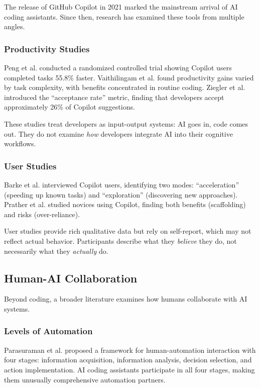 \documentclass{ntlabs-preprint}
\begin{document}
The release of GitHub Copilot in 2021 marked the mainstream arrival of AI coding assistants. Since then, research has examined these tools from multiple angles.

\subsubsection{Productivity Studies}

Peng et al. \citep{peng2023impact} conducted a randomized controlled trial showing Copilot users completed tasks 55.8\% faster. Vaithilingam et al. \citep{vaithilingam2022expectation} found productivity gains varied by task complexity, with benefits concentrated in routine coding. Ziegler et al. \citep{ziegler2022productivity} introduced the ``acceptance rate'' metric, finding that developers accept approximately 26\% of Copilot suggestions.

These studies treat developers as input-output systems: AI goes in, code comes out. They do not examine \textit{how} developers integrate AI into their cognitive workflows.

\subsubsection{User Studies}

Barke et al. \citep{barke2023grounded} interviewed Copilot users, identifying two modes: ``acceleration'' (speeding up known tasks) and ``exploration'' (discovering new approaches). Prather et al. \citep{prather2023s} studied novices using Copilot, finding both benefits (scaffolding) and risks (over-reliance).

User studies provide rich qualitative data but rely on self-report, which may not reflect actual behavior. Participants describe what they \textit{believe} they do, not necessarily what they \textit{actually} do.

\subsection{Human-AI Collaboration}

Beyond coding, a broader literature examines how humans collaborate with AI systems.

\subsubsection{Levels of Automation}

Parasuraman et al. \citep{parasuraman2000model} proposed a framework for human-automation interaction with four stages: information acquisition, information analysis, decision selection, and action implementation. AI coding assistants participate in all four stages, making them unusually comprehensive automation partners.
\end{document}
